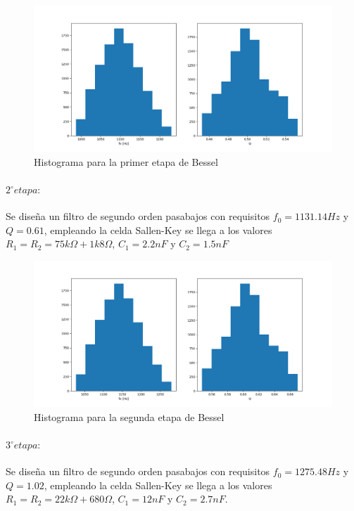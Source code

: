 \begin{figure}[H]
	\centering
	\includegraphics[scale=0.4]{../EJ1/Recursos/bessel_histogram_one.png}
	\caption{Histograma para la primer etapa de Bessel}
	\label{fig:bessel_histogram_one}
\end{figure}

\paragraph{$2^{\circ} etapa:$} Se dise\~na un filtro de segundo orden pasabajos con requisitos $f_0 = 1131.14Hz$ y $Q = 0.61$, empleando la celda Sallen-Key se llega a los valores $R_1 = R_2 = 75k \Omega + 1k8\Omega$, $C_1 = 2.2nF$ y $C_2 = 1.5nF$

\begin{figure}[H]
	\centering
	\includegraphics[scale=0.4]{../EJ1/Recursos/bessel_histogram_two.png}
	\caption{Histograma para la segunda etapa de Bessel}
	\label{fig:bessel_histogram_two}
\end{figure}

\paragraph{$3^{\circ} etapa:$} Se dise\~na un filtro de segundo orden pasabajos con requisitos $f_0 = 1275.48Hz$ y $Q = 1.02$, empleando la celda Sallen-Key se llega a los valores $R_1 = R_2 = 22k \Omega + 680\Omega$, $C_1 = 12nF$ y $C_2 = 2.7nF$.


